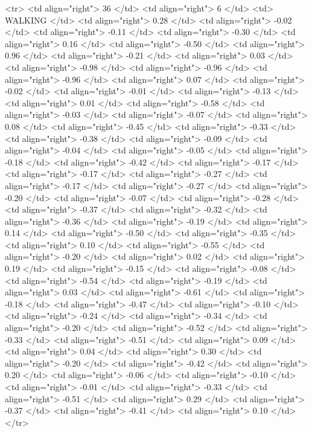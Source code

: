   <tr> <td align="right"> 36 </td> <td align="right">   6 </td> <td> WALKING </td> <td align="right"> 0.28 </td> <td align="right"> -0.02 </td> <td align="right"> -0.11 </td> <td align="right"> -0.30 </td> <td align="right"> 0.16 </td> <td align="right"> -0.50 </td> <td align="right"> 0.96 </td> <td align="right"> -0.21 </td> <td align="right"> 0.03 </td> <td align="right"> -0.98 </td> <td align="right"> -0.96 </td> <td align="right"> -0.96 </td> <td align="right"> 0.07 </td> <td align="right"> -0.02 </td> <td align="right"> -0.01 </td> <td align="right"> -0.13 </td> <td align="right"> 0.01 </td> <td align="right"> -0.58 </td> <td align="right"> -0.03 </td> <td align="right"> -0.07 </td> <td align="right"> 0.08 </td> <td align="right"> -0.45 </td> <td align="right"> -0.33 </td> <td align="right"> -0.38 </td> <td align="right"> -0.09 </td> <td align="right"> -0.04 </td> <td align="right"> -0.05 </td> <td align="right"> -0.18 </td> <td align="right"> -0.42 </td> <td align="right"> -0.17 </td> <td align="right"> -0.17 </td> <td align="right"> -0.27 </td> <td align="right"> -0.17 </td> <td align="right"> -0.27 </td> <td align="right"> -0.20 </td> <td align="right"> -0.07 </td> <td align="right"> -0.28 </td> <td align="right"> -0.37 </td> <td align="right"> -0.32 </td> <td align="right"> -0.36 </td> <td align="right"> -0.19 </td> <td align="right"> 0.14 </td> <td align="right"> -0.50 </td> <td align="right"> -0.35 </td> <td align="right"> 0.10 </td> <td align="right"> -0.55 </td> <td align="right"> -0.20 </td> <td align="right"> 0.02 </td> <td align="right"> 0.19 </td> <td align="right"> -0.15 </td> <td align="right"> -0.08 </td> <td align="right"> -0.54 </td> <td align="right"> -0.19 </td> <td align="right"> 0.03 </td> <td align="right"> -0.61 </td> <td align="right"> -0.18 </td> <td align="right"> -0.47 </td> <td align="right"> -0.10 </td> <td align="right"> -0.24 </td> <td align="right"> -0.34 </td> <td align="right"> -0.20 </td> <td align="right"> -0.52 </td> <td align="right"> -0.33 </td> <td align="right"> -0.51 </td> <td align="right"> 0.09 </td> <td align="right"> 0.04 </td> <td align="right"> 0.30 </td> <td align="right"> -0.20 </td> <td align="right"> -0.42 </td> <td align="right"> 0.20 </td> <td align="right"> -0.06 </td> <td align="right"> -0.10 </td> <td align="right"> -0.01 </td> <td align="right"> -0.33 </td> <td align="right"> -0.51 </td> <td align="right"> 0.29 </td> <td align="right"> -0.37 </td> <td align="right"> -0.41 </td> <td align="right"> 0.10 </td> </tr>
